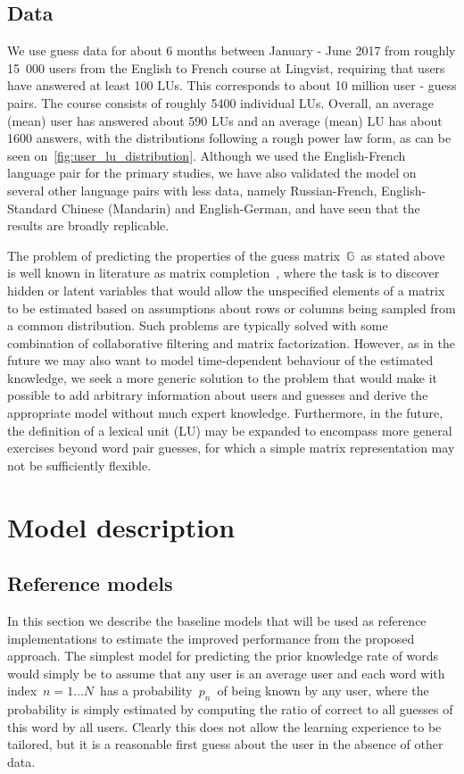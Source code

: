 \subsection{Data}
We use guess data for about 6 months between January - June 2017 from roughly 15~000 users from the English to French course at Lingvist, requiring that users have answered at least 100 LUs. This corresponds to about 10 million user - guess pairs. The course consists of roughly 5400 individual LUs. Overall, an average (mean) user has answered about 590 LUs and an average (mean) LU has about 1600 answers, with the distributions following a rough power law form, as can be seen on~\cref{fig:user_lu_distribution}. Although we used the English-French language pair for the primary studies, we have also validated the model on several other language pairs with less data, namely Russian-French, English-Standard Chinese (Mandarin) and English-German, and have seen that the results are broadly replicable.

The problem of predicting the properties of the guess matrix~$\mathbb{G}$~as stated above is well known in literature as matrix completion~\cite{candes2009exact}, where the task is to discover hidden or latent variables that would allow the unspecified elements of a matrix to be estimated based on assumptions about rows or columns being sampled from a common distribution. Such problems are typically solved with some combination of collaborative filtering and matrix factorization. However, as in the future we may also want to model time-dependent behaviour of the estimated knowledge, we seek a more generic solution to the problem that would make it possible to add arbitrary information about users and guesses and derive the appropriate model without much expert knowledge. Furthermore, in the future, the definition of a lexical unit (LU) may be expanded to encompass more general exercises beyond word pair guesses, for which a simple matrix representation may not be sufficiently flexible. 

\section{Model description}
\label{sec:lingvist_model}

\subsection{Reference models}

In this section we describe the baseline models that will be used as reference implementations to estimate the improved performance from the proposed approach. The simplest model for predicting the prior knowledge rate of words would simply be to assume that any user is an average user and each word with index~$n=1 \dots N$~has a probability~$p_n$~of being known by any user, where the probability is simply estimated by computing the ratio of correct to all guesses of this word by all users. Clearly this does not allow the learning experience to be tailored, but it is a reasonable first guess about the user in the absence of other data.

